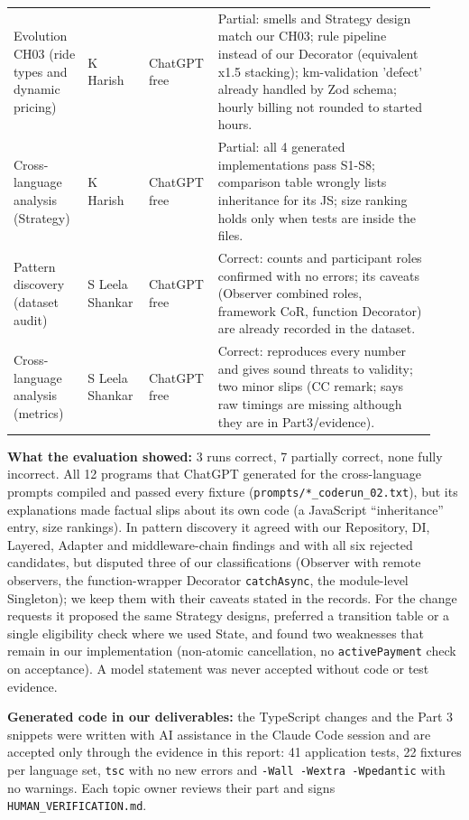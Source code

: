 \documentclass[11pt,a4paper]{article}
\begin{document}
\begin{longtable}{@{}P{0.17\linewidth}P{0.14\linewidth}P{0.12\linewidth}P{0.5\linewidth}@{}}
Evolution CH03 (ride types and dynamic pricing) & K Harish & ChatGPT free & Partial: smells and Strategy design match our CH03; rule pipeline instead of our Decorator (equivalent x1.5 stacking); km-validation 'defect' already handled by Zod schema; hourly billing not rounded to started hours. \\
Cross-language analysis (Strategy) & K Harish & ChatGPT free & Partial: all 4 generated implementations pass S1-S8; comparison table wrongly lists inheritance for its JS; size ranking holds only when tests are inside the files. \\
Pattern discovery (dataset audit) & S Leela Shankar & ChatGPT free & Correct: counts and participant roles confirmed with no errors; its caveats (Observer combined roles, framework CoR, function Decorator) are already recorded in the dataset. \\
Cross-language analysis (metrics) & S Leela Shankar & ChatGPT free & Correct: reproduces every number and gives sound threats to validity; two minor slips (CC remark; says raw timings are missing although they are in Part3/evidence). \\
\bottomrule\end{longtable}

\textbf{What the evaluation showed:} 3 runs correct, 7 partially correct, none fully incorrect. All 12 programs that ChatGPT generated for the
cross-language prompts compiled and passed every fixture (\texttt{prompts/*\_coderun\_02.txt}), but its explanations made factual slips about its
own code (a JavaScript ``inheritance'' entry, size rankings). In pattern discovery it agreed with our Repository, DI, Layered, Adapter and
middleware-chain findings and with all six rejected candidates, but disputed three of our classifications (Observer with remote observers,
the function-wrapper Decorator \texttt{catchAsync}, the module-level Singleton); we keep them with their caveats stated in the records. For the
change requests it proposed the same Strategy designs, preferred a transition table or a single eligibility check where we used State, and
found two weaknesses that remain in our implementation (non-atomic cancellation, no \texttt{activePayment} check on acceptance). A model
statement was never accepted without code or test evidence.

\textbf{Generated code in our deliverables:} the TypeScript changes and the Part 3 snippets were written with AI assistance in the Claude Code session
and are accepted only through the evidence in this report: 41 application tests, 22 fixtures per language set, \texttt{tsc} with no new errors and
\texttt{-Wall -Wextra -Wpedantic} with no warnings. Each topic owner reviews their part and signs \texttt{HUMAN\_VERIFICATION.md}.
\end{document}

